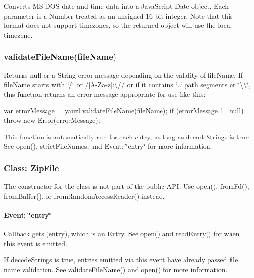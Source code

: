 Converts M\+S-\/\+D\+OS {\ttfamily date} and {\ttfamily time} data into a Java\+Script {\ttfamily Date} object. Each parameter is a {\ttfamily Number} treated as an unsigned 16-\/bit integer. Note that this format does not support timezones, so the returned object will use the local timezone.

\subsubsection*{validate\+File\+Name(file\+Name)}

Returns {\ttfamily null} or a {\ttfamily String} error message depending on the validity of {\ttfamily file\+Name}. If {\ttfamily file\+Name} starts with {\ttfamily \char`\"{}/\char`\"{}} or {\ttfamily /\mbox{[}A-\/\+Za-\/z\mbox{]}\+:\textbackslash{}//} or if it contains {\ttfamily \char`\"{}..\char`\"{}} path segments or {\ttfamily \char`\"{}\textbackslash{}\textbackslash{}\char`\"{}}, this function returns an error message appropriate for use like this\+:


\begin{DoxyCode}
var errorMessage = yauzl.validateFileName(fileName);
if (errorMessage != null) throw new Error(errorMessage);
\end{DoxyCode}


This function is automatically run for each entry, as long as {\ttfamily decode\+Strings} is {\ttfamily true}. See {\ttfamily open()}, {\ttfamily strict\+File\+Names}, and {\ttfamily Event\+: \char`\"{}entry\char`\"{}} for more information.

\subsubsection*{Class\+: Zip\+File}

The constructor for the class is not part of the public A\+PI. Use {\ttfamily open()}, {\ttfamily from\+Fd()}, {\ttfamily from\+Buffer()}, or {\ttfamily from\+Random\+Access\+Reader()} instead.

\paragraph*{Event\+: \char`\"{}entry\char`\"{}}

Callback gets {\ttfamily (entry)}, which is an {\ttfamily Entry}. See {\ttfamily open()} and {\ttfamily read\+Entry()} for when this event is emitted.

If {\ttfamily decode\+Strings} is {\ttfamily true}, entries emitted via this event have already passed file name validation. See {\ttfamily validate\+File\+Name()} and {\ttfamily open()} for more information.

